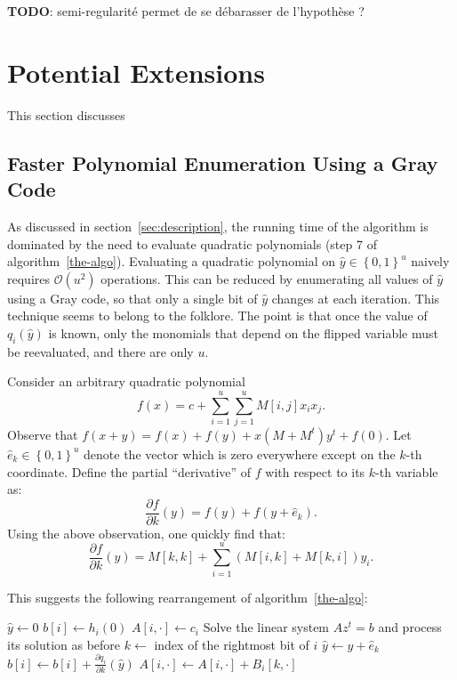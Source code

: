 \documentclass[a4paper,UKenglish,cleveref, autoref]{lipics-v2019}
\newcommand{\bits}{\left\{0, 1\right\}}
\newcommand{\bigO}[1]{\ensuremath{\mathcal{O}\left( #1 \right)} }
\newcommand{\red}{\color{red}}
\newcommand{\TODO}[1]{{\red \textbf{TODO}:} #1\xspace}
\begin{document}
\TODO{semi-regularité permet de se débarasser de l'hypothèse ?}

\section{Potential Extensions}
\label{sec:extensions}

This section discusses

\subsection{Faster Polynomial Enumeration Using a Gray Code}

As discussed in section~\ref{sec:description}, the running time of the algorithm
is dominated by the need to evaluate quadratic polynomials (step 7 of
algorithm~\ref{the-algo}). Evaluating a quadratic polynomial on
$\hat y \in \bits^u$ naively requires $\bigO{u^2}$ operations. This can be
reduced by enumerating all values of $\hat y$ using a Gray code, so that only a
single bit of $\hat y$ changes at each iteration. This technique seems to belong
to the folklore. The point is that once the value of $q_i(\hat y)$ is known,
only the monomials that depend on the flipped variable must be reevaluated, and
there are only $u$.

Consider an arbitrary quadratic polynomial
\[
  f(x) = c + \sum_{i=1}^u \sum_{j=1}^u M[i,j] x_i x_j.
\]
Observe that $f(x + y) = f(x) + f(y) + x \left(M + M^t\right)y^t + f(0)$. Let
$\hat e_k \in \bits^u$ denote the vector which is zero everywhere except on the
$k$-th coordinate.  Define the partial ``derivative'' of $f$ with respect to its
$k$-th variable as:
\[
  \frac{\partial f}{\partial k}(y) = f(y) + f(y + \hat e_k).
\]
Using the above observation, one quickly find that:
\[
  \frac{\partial f}{\partial k}(y) = M[k,k] + \sum_{i=1}^u (M[i,k] + M[k, i]) y_i.
\]

This suggests the following rearrangement of algorithm~\ref{the-algo}:

\begin{algorithmic}[1]
  \State $\hat y \gets 0$ 
  \State $b[i] \gets  h_i(0)$
  \State $A[i, \cdot] \gets c_i$
  \EndFor
   
  \State Solve the linear system $Az^t = b$ and process its solution as before
  \State $k \gets $ index of the rightmost bit of $i$ 
  \State $\hat y \gets \hat y + \hat e_k$
   
  \State $b[i] \gets b[i] + \frac{\partial q_i}{\partial k}(\hat y)$
  \State $A[i, \cdot] \gets A[i, \cdot] + B_i[k, \cdot]$
  \EndFor
  \EndFor
\end{algorithmic}
\end{document}
